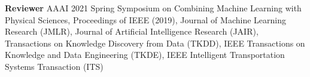 \documentclass[margin,line]{res}
\newenvironment{list2}{
  \begin{list}{$\bullet$}{%
      \setlength{\itemsep}{0in}
      \setlength{\parsep}{0in} \setlength{\parskip}{0in}
      \setlength{\topsep}{0in} \setlength{\partopsep}{0in} 
      \setlength{\leftmargin}{0.2in}}}{\end{list}}
\begin{document}
\begin{resume}
{\bf Reviewer}
AAAI 2021 Spring Symposium on Combining Machine Learning with Physical Sciences,
Proceedings of IEEE (2019), Journal of Machine Learning Research (JMLR), Journal of Artificial Intelligence Research (JAIR), Transactions on Knowledge Discovery from Data (TKDD), IEEE Transactions on Knowledge and Data Engineering (TKDE),  IEEE Intelligent Transportation Systems Transaction (ITS)




%


%
%
%
%



\end{resume}
\end{document}
